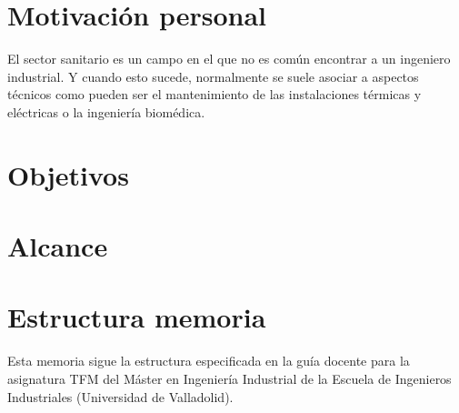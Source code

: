 \section{Motivación personal}

El sector sanitario es un campo en el que no es común encontrar a un ingeniero industrial. Y cuando esto sucede, normalmente se suele asociar a aspectos técnicos como pueden ser el mantenimiento de las instalaciones térmicas y eléctricas o la ingeniería biomédica.

\section{Objetivos}

\section{Alcance}





\section{Estructura memoria}

Esta memoria sigue la estructura especificada en la guía docente para la asignatura TFM del Máster en Ingeniería Industrial de la Escuela de Ingenieros Industriales (Universidad de Valladolid). \cite{lion2010}
